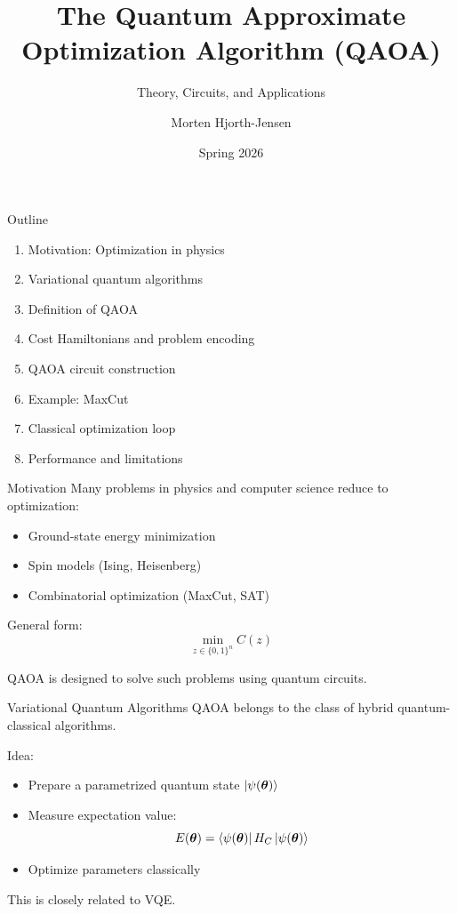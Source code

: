 \documentclass{beamer}
\title{The Quantum Approximate Optimization Algorithm (QAOA)}
\subtitle{Theory, Circuits, and Applications}
\author{Morten Hjorth-Jensen}
\date{Spring 2026}
\begin{document}
\frame{\titlepage}

\begin{frame}{Outline}
\begin{enumerate}
\item Motivation: Optimization in physics
\item Variational quantum algorithms
\item Definition of QAOA
\item Cost Hamiltonians and problem encoding
\item QAOA circuit construction
\item Example: MaxCut
\item Classical optimization loop
\item Performance and limitations
\end{enumerate}
\end{frame}

\begin{frame}{Motivation}
Many problems in physics and computer science reduce to optimization:

\begin{itemize}
\item Ground-state energy minimization
\item Spin models (Ising, Heisenberg)
\item Combinatorial optimization (MaxCut, SAT)
\end{itemize}

General form:
\[
\min_{z \in \{0,1\}^n} C(z)
\]

QAOA is designed to solve such problems using quantum circuits.
\end{frame}

\begin{frame}{Variational Quantum Algorithms}
QAOA belongs to the class of hybrid quantum-classical algorithms.

Idea:
\begin{itemize}
\item Prepare a parametrized quantum state \(\ket{\psi(\boldsymbol{\theta})}\)
\item Measure expectation value:
\[
E(\boldsymbol{\theta}) = \bra{\psi(\boldsymbol{\theta})} H_C \ket{\psi(\boldsymbol{\theta})}
\]
\item Optimize parameters classically
\end{itemize}

This is closely related to VQE.
\end{frame}
\end{document}
